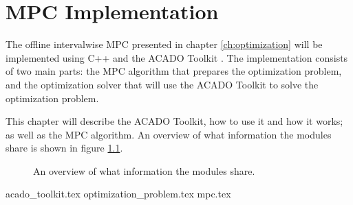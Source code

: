 \chapter{MPC Implementation}

The offline intervalwise MPC presented in chapter \ref{ch:optimization} will be implemented using C++ and the ACADO Toolkit \cite{acadoHOUSKA}. The implementation consists of two main parts: the MPC algorithm that prepares the optimization problem, and the optimization solver that will use the ACADO Toolkit to solve the optimization problem.

This chapter will describe the ACADO Toolkit, how to use it and how it works; as well as the MPC algorithm. An overview of what information the modules share is shown in figure \ref{fig:sys_overview}.

\begin{figure}[h]
	\centering
	\caption{An overview of what information the modules share.}
	\label{fig:sys_overview}
\end{figure}
	
{acado_toolkit.tex}
{optimization_problem.tex}
{mpc.tex}